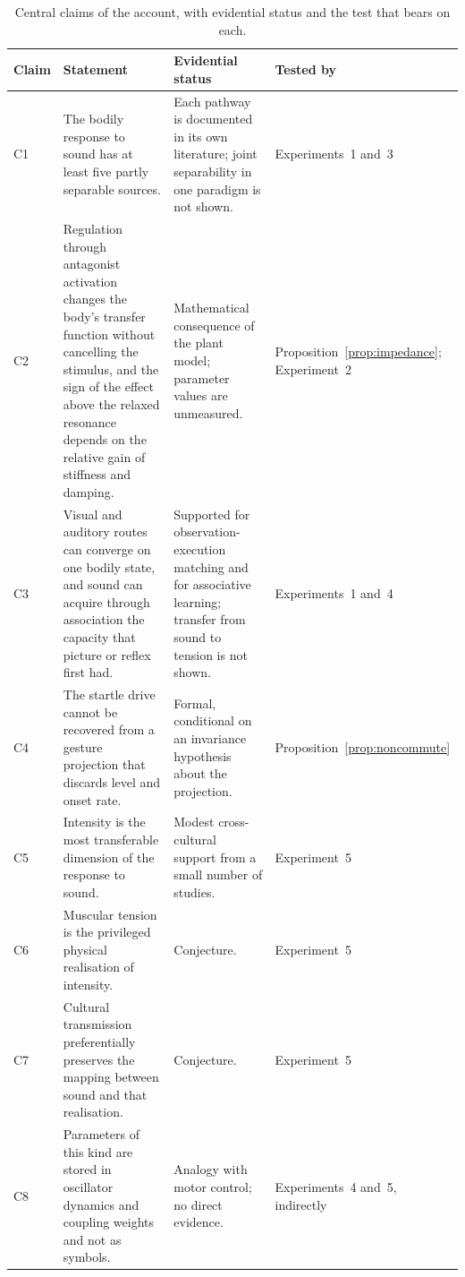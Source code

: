 \documentclass[11pt]{article}
\theoremstyle{plain}
\theoremstyle{definition}
\begin{document}
\begin{table}[t]
\centering
\small
\renewcommand{\arraystretch}{1.25}
\begin{tabular}{@{}>{\raggedright\arraybackslash}p{0.9cm}>{\raggedright\arraybackslash}p{6.3cm}>{\raggedright\arraybackslash}p{4.6cm}>{\raggedright\arraybackslash}p{2.7cm}@{}}
\toprule
Claim & Statement & Evidential status & Tested by \\
\midrule
C1 & The bodily response to sound has at least five partly separable sources. & Each pathway is documented in its own literature; joint separability in one paradigm is not shown. & Experiments~1 and~3 \\
C2 & Regulation through antagonist activation changes the body's transfer function without cancelling the stimulus, and the sign of the effect above the relaxed resonance depends on the relative gain of stiffness and damping. & Mathematical consequence of the plant model; parameter values are unmeasured. & Proposition~\ref{prop:impedance}; Experiment~2 \\
C3 & Visual and auditory routes can converge on one bodily state, and sound can acquire through association the capacity that picture or reflex first had. & Supported for observation-execution matching and for associative learning; transfer from sound to tension is not shown. & Experiments~1 and~4 \\
C4 & The startle drive cannot be recovered from a gesture projection that discards level and onset rate. & Formal, conditional on an invariance hypothesis about the projection. & Proposition~\ref{prop:noncommute} \\
C5 & Intensity is the most transferable dimension of the response to sound. & Modest cross-cultural support from a small number of studies. & Experiment~5 \\
C6 & Muscular tension is the privileged physical realisation of intensity. & Conjecture. & Experiment~5 \\
C7 & Cultural transmission preferentially preserves the mapping between sound and that realisation. & Conjecture. & Experiment~5 \\
C8 & Parameters of this kind are stored in oscillator dynamics and coupling weights and not as symbols. & Analogy with motor control; no direct evidence. & Experiments~4 and~5, indirectly \\
\bottomrule
\end{tabular}
\caption{Central claims of the account, with evidential status and the test that bears on each.}
\label{tab:claims}
\end{table}
\end{document}
